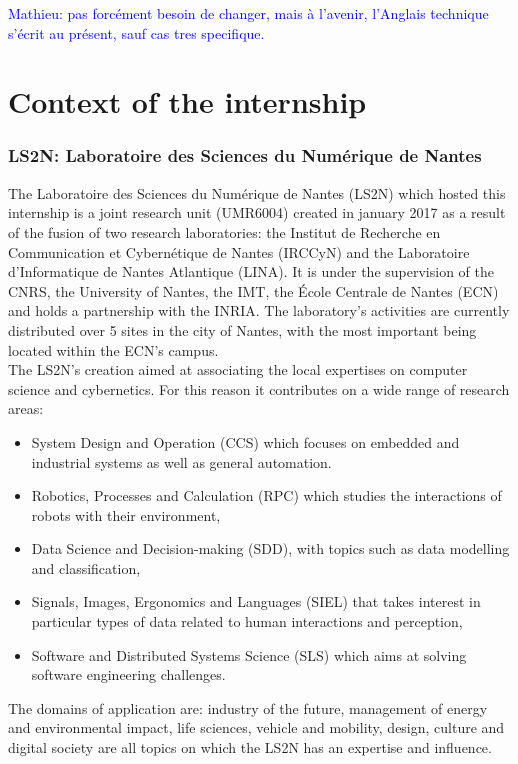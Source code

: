 \documentclass[12pt,times,onecolumn]{article}
\newcommand{\ml}[1]{\textcolor{blue}{ Mathieu: #1}}
\begin{document}
\ml{pas forcément besoin de changer, mais à l'avenir, l'Anglais technique s'écrit au présent, sauf cas tres specifique.}

\clearpage
\tableofcontents
\clearpage
\listoffigures
\listoftables
\clearpage



\part{Context of the internship}
\section{LS2N: Laboratoire des Sciences du Num\'erique de Nantes}
The Laboratoire des Sciences du Num\'erique de Nantes (LS2N) which hosted this internship is a joint research unit (UMR6004) created in january 2017 as a result of the fusion of two research laboratories: the Institut de Recherche en Communication et Cybern\'etique de Nantes (IRCCyN) and the Laboratoire d'Informatique de Nantes Atlantique (LINA). It is under the supervision of the CNRS, the University of Nantes, the IMT, the \'Ecole Centrale de Nantes (ECN) and holds a partnership with the INRIA. The laboratory's activities are currently distributed over 5 sites in the city of Nantes, with the most important being located within the ECN's campus.\\

The LS2N's creation aimed at associating the local expertises on computer science and cybernetics. For this reason it contributes on a wide range of research areas:
\begin{itemize}
\item System Design and Operation (CCS) which focuses on embedded and industrial systems as well as general automation.
\item Robotics, Processes and Calculation (RPC) which studies the interactions of robots with their environment,
\item Data Science and Decision-making (SDD), with topics such as data modelling and classification,
\item Signals, Images, Ergonomics and Languages (SIEL) that takes interest in particular types of data related to human interactions and perception,
\item Software and Distributed Systems Science (SLS) which aims at solving software engineering challenges.
\end{itemize}
The domains of application are: industry of the future, management of energy and environmental impact, life sciences, vehicle and mobility, design, culture and digital society are all topics on which the LS2N has an expertise and influence.\\
\end{document}
